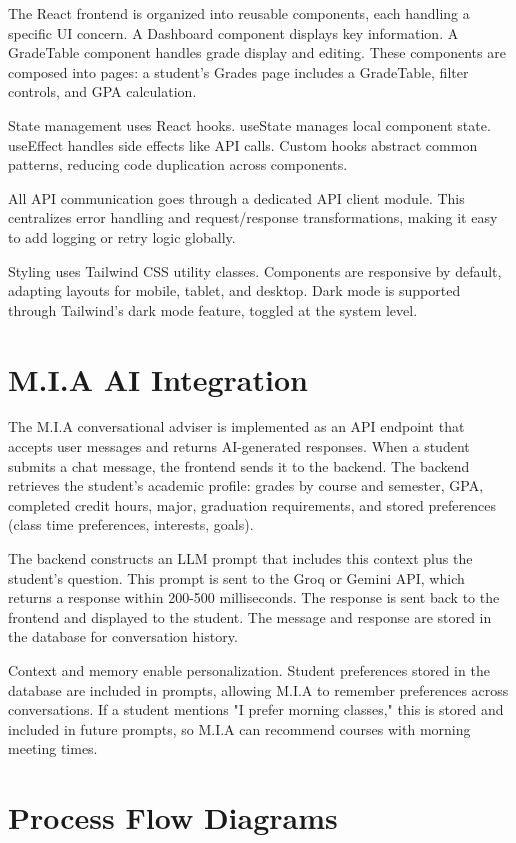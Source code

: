 \documentclass[12pt,a4paper]{report}
\begin{document}
The React frontend is organized into reusable components, each handling a specific UI concern. A Dashboard component displays key information. A GradeTable component handles grade display and editing. These components are composed into pages: a student's Grades page includes a GradeTable, filter controls, and GPA calculation.

State management uses React hooks. useState manages local component state. useEffect handles side effects like API calls. Custom hooks abstract common patterns, reducing code duplication across components.

All API communication goes through a dedicated API client module. This centralizes error handling and request/response transformations, making it easy to add logging or retry logic globally.

Styling uses Tailwind CSS utility classes. Components are responsive by default, adapting layouts for mobile, tablet, and desktop. Dark mode is supported through Tailwind's dark mode feature, toggled at the system level.

\section{M.I.A AI Integration}

The M.I.A conversational adviser is implemented as an API endpoint that accepts user messages and returns AI-generated responses. When a student submits a chat message, the frontend sends it to the backend. The backend retrieves the student's academic profile: grades by course and semester, GPA, completed credit hours, major, graduation requirements, and stored preferences (class time preferences, interests, goals).

The backend constructs an LLM prompt that includes this context plus the student's question. This prompt is sent to the Groq or Gemini API, which returns a response within 200-500 milliseconds. The response is sent back to the frontend and displayed to the student. The message and response are stored in the database for conversation history.

Context and memory enable personalization. Student preferences stored in the database are included in prompts, allowing M.I.A to remember preferences across conversations. If a student mentions "I prefer morning classes," this is stored and included in future prompts, so M.I.A can recommend courses with morning meeting times.

\section{Process Flow Diagrams}
\end{document}

